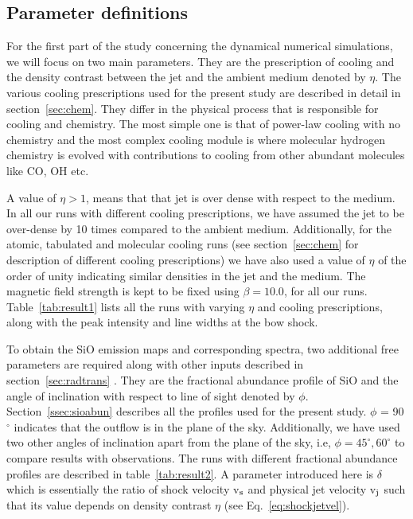 \documentclass[useAMS,usenatbib]{mn2e}
\begin{document}
\subsection{Parameter definitions}
\label{ssec:paradef}
For the first part of the study concerning the dynamical numerical
simulations, we will focus on two main parameters. They are the
prescription of cooling and the density contrast between the jet and
the ambient medium denoted by $\eta$. The various cooling prescriptions used for the present study are
described in detail in section~\ref{sec:chem}. They differ in the
physical process that is responsible for cooling and chemistry. The
most simple one is that of power-law cooling with no chemistry and the
most complex cooling module is where molecular hydrogen chemistry is
evolved with contributions to cooling from other abundant molecules
like CO, OH etc. 
%

A value of $\eta > 1$, means that
that jet is over dense with respect to the medium. In all our runs with
different cooling prescriptions, we have assumed the jet to be
over-dense by 10 times compared to the ambient medium. Additionally, for
the atomic, tabulated and molecular cooling runs (see section~\ref{sec:chem}
for description of different cooling prescriptions) we have also used a
value of $\eta$ of the order of unity indicating similar densities in
the jet and the medium. 
The magnetic field strength is kept to be fixed using $\beta = 10.0$,
for all our runs. Table~\ref{tab:result1} lists all the runs with
varying $\eta$ and cooling prescriptions, along with the peak
intensity and line widths at the bow shock.
%

To obtain the SiO emission maps and corresponding
spectra, two additional free parameters are required along with other
inputs described in section~\ref{sec:radtrans} . They are
the fractional abundance profile of SiO and the angle of inclination with
respect to line of sight denoted by $\phi$. Section~\ref{ssec:sioabun}
describes all the profiles used for the present study. $\phi$ = 90$^{\circ}$ indicates that
the outflow is in the plane of the sky. 
Additionally, we have used two other angles of inclination apart from the
plane of the sky, i.e, $\phi = 45^{\circ}, 60^{\circ}$ to compare
results with observations. The runs with different fractional
abundance profiles are described in table~\ref{tab:result2}. A
parameter introduced here is $\delta$ which is essentially the ratio
of shock velocity v$_{\rm s}$ and physical jet velocity v$_{\rm
  j}$ such that its value depends on density contrast $\eta$
(see Eq.~\ref{eq:shockjetvel}).
\end{document}
